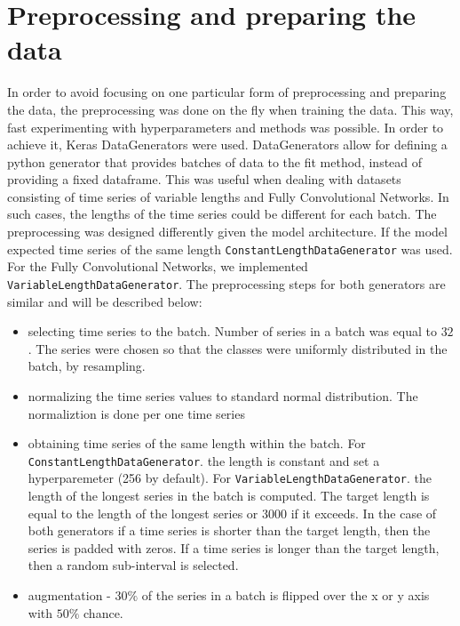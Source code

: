 \documentclass[a4paper,11pt,twoside]{report}
\theoremstyle{definition}
\begin{document}
\section{Preprocessing and preparing the data}\label{section:preprocessing}
In order to avoid focusing on one particular form of preprocessing and preparing the data, the preprocessing was done on the fly when training the data. This way, fast experimenting with hyperparameters and methods was possible. In order to achieve it, Keras DataGenerators were used. DataGenerators allow for defining a python generator that provides batches of data to the fit method, instead of providing a fixed dataframe. This was useful when dealing with datasets consisting of time series of variable lengths and Fully Convolutional Networks. In such cases, the lengths of the time series could be different for each batch.
The preprocessing was designed differently given the model architecture. If the model expected time series of the same length \texttt{ConstantLengthDataGenerator} was used. For the Fully Convolutional Networks, we implemented \texttt{VariableLengthDataGenerator}.
The preprocessing steps for both generators are similar and will be described below:
\begin{itemize}
	\item selecting time series to the batch. Number of series in a batch was equal to $32$. The series were chosen so that the classes were uniformly distributed in the batch, by resampling.
	\item normalizing the time series values to standard normal distribution. The normaliztion is done per one time series
	\item obtaining time series of the same length within the batch. For \texttt{ConstantLengthDataGenerator}.
 the length is constant and set a hyperparemeter (256 by default). For \texttt{VariableLengthDataGenerator}.
the length of the longest series in the batch is computed. The target length is equal to the length of the longest series or $3000$ if it exceeds. In the case of both generators if a time series is shorter than the target length, then the series is padded with zeros. If a time series is longer than the target length, then a random sub-interval is selected.

\item augmentation - $30\%$ of the series in a batch is flipped over the x or y axis with $50\%$ chance.

\end{itemize}
\end{document}
